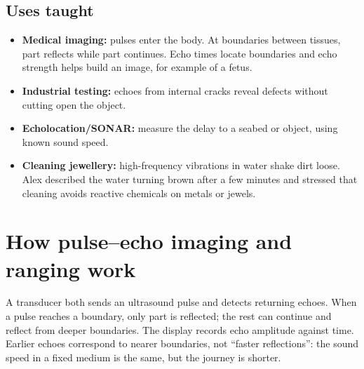 \documentclass[11pt,a4paper]{article}
\newcommand{\term}[1]{\textbf{#1}}
\begin{document}
\subsection{Uses taught}
\begin{itemize}
\item \term{Medical imaging:} pulses enter the body. At boundaries between tissues, part reflects while part continues. Echo times locate boundaries and echo strength helps build an image, for example of a fetus.
\item \term{Industrial testing:} echoes from internal cracks reveal defects without cutting open the object.
\item \term{Echolocation/SONAR:} measure the delay to a seabed or object, using known sound speed.
\item \term{Cleaning jewellery:} high-frequency vibrations in water shake dirt loose. Alex described the water turning brown after a few minutes and stressed that cleaning avoids reactive chemicals on metals or jewels.
\end{itemize}

\section{How pulse--echo imaging and ranging work}
A transducer both sends an ultrasound pulse and detects returning echoes. When a pulse reaches a boundary, only part is reflected; the rest can continue and reflect from deeper boundaries. The display records echo amplitude against time. Earlier echoes correspond to nearer boundaries, not ``faster reflections'': the sound speed in a fixed medium is the same, but the journey is shorter.

\begin{center}
\end{center}
\end{document}
